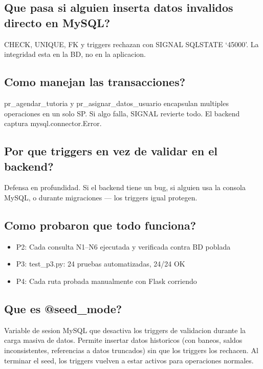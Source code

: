 \documentclass[10pt,a4paper]{article}
\begin{document}
\subsection{Que pasa si alguien inserta datos invalidos directo en MySQL?}
CHECK, UNIQUE, FK y triggers rechazan con SIGNAL SQLSTATE `45000'. La integridad esta en la BD, no en la aplicacion.

\subsection{Como manejan las transacciones?}
pr\_agendar\_tutoria y pr\_asignar\_datos\_usuario encapsulan multiples operaciones en un solo SP. Si algo falla, SIGNAL revierte todo. El backend captura mysql.connector.Error.

\subsection{Por que triggers en vez de validar en el backend?}
Defensa en profundidad. Si el backend tiene un bug, si alguien usa la consola MySQL, o durante migraciones --- los triggers igual protegen.

\subsection{Como probaron que todo funciona?}
\begin{itemize}
    \item P2: Cada consulta N1--N6 ejecutada y verificada contra BD poblada
    \item P3: test\_p3.py: 24 pruebas automatizadas, 24/24 OK
    \item P4: Cada ruta probada manualmente con Flask corriendo
\end{itemize}

\subsection{Que es @seed\_mode?}
Variable de sesion MySQL que desactiva los triggers de validacion durante la carga masiva de datos. Permite insertar datos historicos (con baneos, saldos inconsistentes, referencias a datos truncados) sin que los triggers los rechacen. Al terminar el seed, los triggers vuelven a estar activos para operaciones normales.

\end{document}
